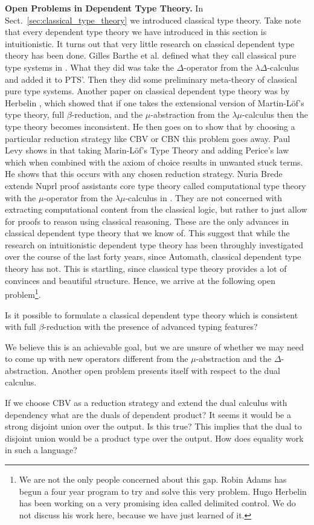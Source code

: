 \documentclass{article}
\begin{document}
\textbf{Open Problems in Dependent Type Theory.}  In
Sect.~\ref{sec:classical_type_theory} we introduced classical type
theory.  Take note that every dependent type theory we have introduced
in this section is intuitionistic. It turns out that very little
research on classical dependent type theory has been done.  Gilles
Barthe et al.  defined what they call classical pure type systems in
\cite{Barthe:1997}.  What they did was take the $\Delta$-operator from
the $\lambda\Delta$-calculus and added it to PTS'.  Then they did some
preliminary meta-theory of classical pure type systems.  Another paper
on classical dependent type theory was by Herbelin
\cite{Herbelin:2005}, which showed that if one takes the extensional
version of Martin-L\"of's type theory, full $\beta$-reduction, and the
$\mu$-abstraction from the $\lambda\mu$-calculus then the type theory
becomes inconsistent.  He then goes on to show that by choosing a
particular reduction strategy like CBV or CBN this problem goes away.
Paul Levy shows in \cite{Levy:2001} that taking Marin-L\"of's Type
Theory and adding Perice's law which when combined with the axiom of
choice results in unwanted stuck terms.  He shows that this occurs
with any chosen reduction strategy.  Nuria Brede extends Nuprl proof
assistants core type theory called computational type theory with the
$\mu$-operator from the $\lambda\mu$-calculus in \cite{Brede:2009}.
They are not concerned with extracting computational content from the
classical logic, but rather to just allow for proofs to reason using
classical reasoning.  These are the only advances in classical
dependent type theory that we know of.  This suggest that while the
research on intuitionistic dependent type theory has been throughly
investigated over the course of the last forty years, since Automath,
classical dependent type theory has not.  This is startling, since
classical type theory provides a lot of convinces and beautiful
structure.  Hence, we arrive at the following open problem\footnote{We
  are not the only people concerned about this gap.  Robin Adams has
  begun a four year program to try and solve this very problem.  Hugo
  Herbelin has been working on a very promising idea called delimited
  control.  We do not discuss his work here, because we have just
  learned of it.}.
\begin{openproblem}
  Is it possible to formulate a classical dependent type theory which
  is consistent with full $\beta$-reduction with the presence of
  advanced typing features?
\end{openproblem}
\noindent
We believe this is an achievable goal, but we are unsure of whether we
may need to come up with new operators different from the
$\mu$-abstraction and the $\Delta$-abstraction.  Another open
problem presents itself with respect to the dual calculus.
\begin{openproblem}
  If we choose CBV as a reduction strategy and extend the dual
  calculus with dependency what are the duals of dependent product?
  It seems it would be a strong disjoint union over the output.  Is
  this true?  This implies that the dual to disjoint union would be a
  product type over the output. How does equality work in such a
  language?
\end{openproblem}
\end{document}
